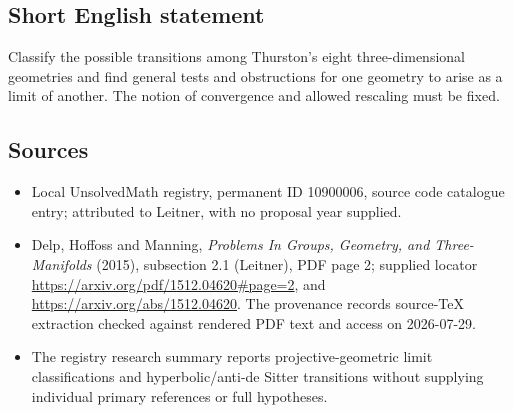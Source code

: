 \documentclass[11pt]{article}
\begin{document}
\subsection{Short English statement}
Classify the possible transitions among Thurston's eight three-dimensional geometries and find general tests and obstructions for one geometry to arise as a limit of another. The notion of convergence and allowed rescaling must be fixed.
\subsection{Sources}
\begin{itemize}
\item Local UnsolvedMath registry, permanent ID 10900006, source code catalogue entry; attributed to Leitner, with no proposal year supplied.
\item Delp, Hoffoss and Manning, \emph{Problems In Groups, Geometry, and Three-Manifolds} (2015), subsection 2.1 (Leitner), PDF page 2; supplied locator \url{https://arxiv.org/pdf/1512.04620#page=2}, and \url{https://arxiv.org/abs/1512.04620}. The provenance records source-TeX extraction checked against rendered PDF text and access on 2026-07-29.
\item The registry research summary reports projective-geometric limit classifications and hyperbolic/anti-de Sitter transitions without supplying individual primary references or full hypotheses.
\end{itemize}
\end{document}
